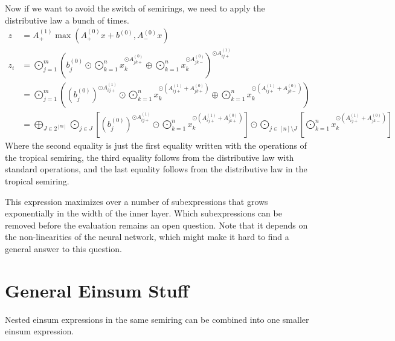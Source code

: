 Now if we want to avoid the switch of semirings, we need to apply the distributive law a bunch of times.
\begin{align*}
    z   & = A^{(1)}_+ \max(A^{(0)}_+ x + b^{(0)}, A^{(0)}_- x)                                                                                                                                                                                                                                                                                                          \\
    z_i & = \bigodot\limits_{j = 1}^{m}\left(b^{(0)}_j \odot \bigodot\limits_{k = 1}^{n} x_k^{\odot A^{(0)}_{jk+}} \oplus \bigodot\limits_{k = 1}^{n} x_k^{\odot A^{(0)}_{jk-}}\right)^{\odot A^{(1)}_{ij+}}                                                                                                                                                            \\
        & = \bigodot\limits_{j = 1}^{m}\left(\left(b^{(0)}_j\right)^{\odot A^{(1)}_{ij+}} \odot \bigodot\limits_{k = 1}^{n} x_k^{\odot \left(A^{(1)}_{ij+} + A^{(0)}_{jk+}\right)} \oplus \bigodot\limits_{k = 1}^{n} x_k^{\odot \left(A^{(1)}_{ij+} + A^{(0)}_{jk-}\right)}\right)                                                                                     \\
        & = \bigoplus\limits_{J \in 2^{[m]}} \bigodot\limits_{j \in J} \left[\left(b^{(0)}_j\right)^{\odot A^{(1)}_{ij+}} \odot \bigodot\limits_{k = 1}^{n} x_k^{\odot \left(A^{(1)}_{ij+} + A^{(0)}_{jk+}\right)}\right] \odot \bigodot\limits_{j \in [n] \setminus J} \left[\bigodot\limits_{k = 1}^{n} x_k^{\odot \left(A^{(1)}_{ij+} + A^{(0)}_{jk-}\right)}\right]
\end{align*}
Where the second equality is just the first equality written with the operations of the tropical semiring,
the third equality follows from the distributive law with standard operations,
and the last equality follows from the distributive law in the tropical semiring.

This expression maximizes over a number of subexpressions that grows exponentially in the width of the inner layer.
Which subexpressions can be removed before the evaluation remains an open question.
Note that it depends on the non-linearities of the neural network, which might make it hard to find a general answer to this question.

\section{General Einsum Stuff}
Nested einsum expressions in the same semiring can be combined into one smaller einsum expression.

